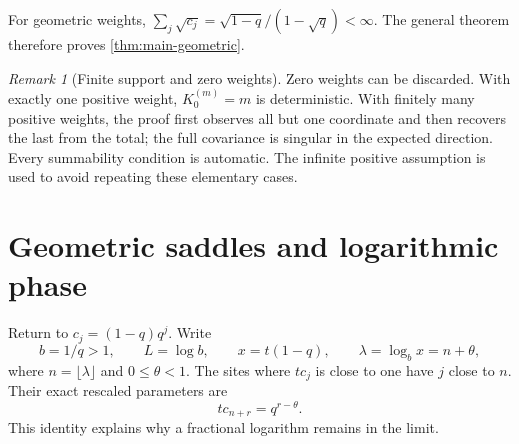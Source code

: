 \documentclass[11pt,a4paper]{article}
\numberwithin{equation}{section}
\theoremstyle{definition}
\theoremstyle{remark}
\newtheorem{remark}[theorem]{Remark}
\begin{document}
For geometric weights,
$\sum_j\sqrt{c_j}=\sqrt{1-q}/(1-\sqrt q)<\infty$.
The general theorem therefore proves \cref{thm:main-geometric}.

\begin{remark}[Finite support and zero weights]
\label{rem:finite-support}
Zero weights can be discarded. With exactly one positive weight,
$K_0^{(m)}=m$ is deterministic. With finitely many positive weights,
the proof first observes all but one coordinate and then recovers the
last from the total; the full covariance is singular in the expected
direction. Every summability condition is automatic. The infinite positive
assumption is used to avoid repeating these elementary cases.
\end{remark}

\section{Geometric saddles and logarithmic phase}
\label{sec:geometric-saddle}

Return to $c_j=(1-q)q^j$. Write
\[
b=1/q>1,\qquad L=\log b,\qquad x=t(1-q),\qquad
\lambda=\log_bx=n+\theta,
\]
where $n=\lfloor\lambda\rfloor$ and $0\le\theta<1$.
The sites where $tc_j$ is close to one have $j$ close to $n$.
Their exact rescaled parameters are
\begin{equation}
tc_{n+r}=q^{r-\theta}.
\label{eq:frontier-parameter}
\end{equation}
This identity explains why a fractional logarithm remains in the limit.
\end{document}
